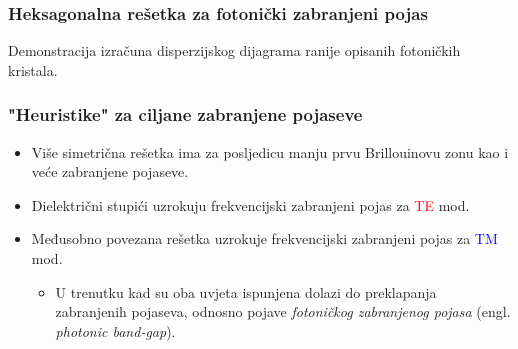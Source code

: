 \documentclass{beamer}
\begin{document}
\begin{frame}
	\frametitle{Heksagonalna rešetka za fotonički zabranjeni pojas}
	\begin{figure}[ht]
	\centering
    	\qquad
		\label{fig:triangular_lattice}
	\end{figure}
\end{frame}

\begin{frame}[standout]
	Demonstracija izračuna disperzijskog dijagrama ranije opisanih
	fotoničkih kristala.
\end{frame}

\begin{frame}
	\frametitle{"Heuristike" za ciljane zabranjene pojaseve}
	\begin{itemize}
		\item Više simetrična rešetka ima za posljedicu manju prvu Brillouinovu
			zonu kao i veće zabranjene pojaseve.
		\item Dielektrični stupići uzrokuju frekvencijski zabranjeni pojas za
			\textcolor{red}{TE} mod.
		\item Međusobno povezana rešetka uzrokuje frekvencijski zabranjeni pojas
            za \textcolor{blue}{TM} mod.
		\begin{itemize}
			\item U trenutku kad su oba uvjeta ispunjena dolazi do preklapanja
				zabranjenih pojaseva, odnosno pojave
                \emph{fotoničkog zabranjenog pojasa}
                (engl. \textit{photonic band-gap}).
		\end{itemize}
	\end{itemize}
\end{frame}
\end{document}

